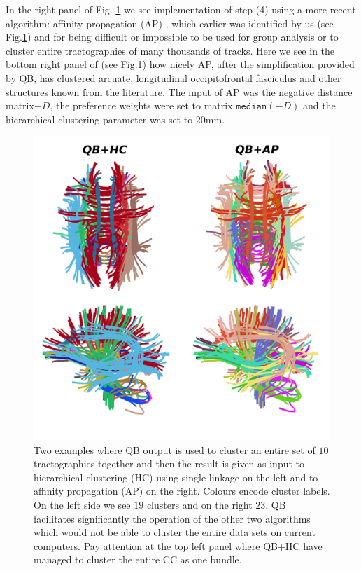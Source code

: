\documentclass[preprint,authoryear,a4paper,10pt,onecolumn]{elsarticle}
\begin{document}
In the right panel of Fig. \ref{Flo:LSC+HC+AP} we see implementation
of step (4) using a more recent algorithm: affinity propagation (AP)
\cite{dueck2009affinity}, which earlier was identified by us (see
Fig.\ref{Flo:LSC+HC+AP}) and \cite{malcolm2009filtered} for being
difficult or impossible to be used for group analysis or to cluster
entire tractographies of many thousands of tracks. 
Here we see in the bottom right panel of (see Fig.\ref{Flo:LSC+HC+AP})
how nicely AP, after the simplification provided by QB, has clustered
arcuate, longitudinal occipitofrontal fasciculus and other structures
known from the literature. The input of AP was the negative distance
matrix$-D$, the preference weights were set to matrix $\mathtt{median}(-D)$
and the hierarchical clustering parameter was set to $20$mm.

%
\begin{figure}
\begin{centering}
\includegraphics[scale=0.7]{last_figures/LSC_with_others}
\par\end{centering}

\label{Flo:LSC+HC+AP}
\caption{Two examples where QB output is used to cluster an entire set
  of $10$ tractographies together and then the result is given as input
  to hierarchical clustering (HC) using single linkage on the left and
  to affinity propagation (AP) on the right. Colours encode cluster
  labels. On the left side we see $19$ clusters and on the right
  $23$. QB facilitates significantly the operation of the other two
  algorithms which would not be able to cluster the entire data sets on
  current computers. Pay attention at the top left panel where QB+HC
  have managed to cluster the entire CC as one bundle.}

\end{figure}
\end{document}

